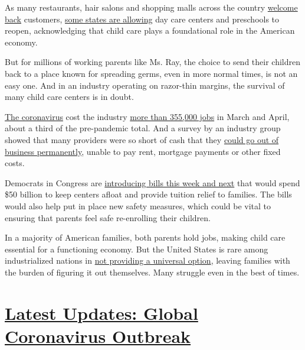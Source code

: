 As many restaurants, hair salons and shopping malls across the country
\href{https://www.nytimes.com/interactive/2020/us/states-reopen-map-coronavirus.html}{welcome
back} customers,
\href{http://www.hunt-institute.org/covid-19-resources/}{some states are
allowing} day care centers and preschools to reopen, acknowledging that
child care plays a foundational role in the American economy.

But for millions of working parents like Ms. Ray, the choice to send
their children back to a place known for spreading germs, even in more
normal times, is not an easy one. And in an industry operating on
razor-thin margins, the survival of many child care centers is in doubt.

\href{https://www.nytimes.com/news-event/coronavirus}{The coronavirus}
cost the industry
\href{https://www.bls.gov/news.release/empsit.t17.htm}{more than 355,000
jobs} in March and April, about a third of the pre-pandemic total. And a
survey by an industry group showed that many providers were so short of
cash that they
\href{https://www.naeyc.org/sites/default/files/globally-shared/downloads/PDFs/our-work/public-policy-advocacy/effects_of_coronavirus_on_child_care.final.pdf}{could
go out of business permanently}, unable to pay rent, mortgage payments
or other fixed costs.

Democrats in Congress are
\href{https://www.nytimes.com/2020/05/27/upshot/virus-childcare-bailout-democrats.html}{introducing
bills this week and next} that would spend \$50 billion to keep centers
afloat and provide tuition relief to families. The bills would also help
put in place new safety measures, which could be vital to ensuring that
parents feel safe re-enrolling their children.

In a majority of American families, both parents hold jobs, making child
care essential for a functioning economy. But the United States is rare
among industrialized nations in
\href{https://www.nytimes.com/2019/08/15/upshot/why-americans-resist-child-care.html}{not
providing a universal option}, leaving families with the burden of
figuring it out themselves. Many struggle even in the best of times.

\hypertarget{latest-updates-global-coronavirus-outbreak}{%
\section{\texorpdfstring{\href{https://www.nytimes.com/2020/08/04/world/coronavirus-cases.html?action=click\&pgtype=Article\&state=default\&region=MAIN_CONTENT_1\&context=storylines_live_updates}{Latest
Updates: Global Coronavirus
Outbreak}}{Latest Updates: Global Coronavirus Outbreak}}\label{latest-updates-global-coronavirus-outbreak}}

